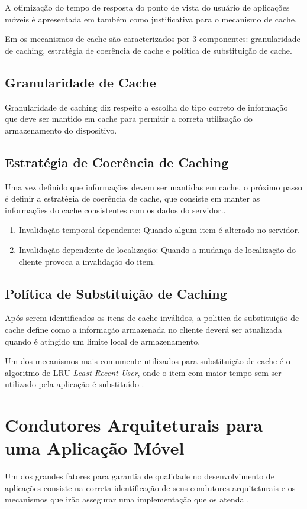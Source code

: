 \documentclass[
	article,			%
	11pt,				%
	oneside,			%
	a4paper,			%
	english,			%
	brazil,				%
	sumario=tradicional
]{abntex2}
\begin{document}
A otimização do tempo de resposta do ponto de vista do usuário de aplicações móveis é apresentada em \cite{xing2015user} também como justificativa para o mecanismo de cache.
 
 Em \cite{rathore2007overview} os mecanismos de cache são caracterizados por 3 componentes: granularidade de caching, estratégia de coerência de cache e política de substituição de cache.

\subsection{Granularidade de Cache}
Granularidade de caching diz respeito a escolha do tipo correto de informação que deve ser mantido em cache para permitir a correta utilização do armazenamento do dispositivo.

\subsection{Estratégia de Coerência de Caching}
Uma vez definido que informações devem ser mantidas em cache, o próximo passo é definir a estratégia de coerência de cache, que consiste em manter as informações do cache consistentes com os dados do servidor..

\begin{enumerate}
	\item Invalidação temporal-dependente:  Quando algum item é alterado no servidor.
	\item Invalidação dependente de localização: Quando a mudança de localização do cliente provoca a invalidação do item.
\end{enumerate}

\subsection{Política de Substituição de Caching}
Após serem identificados os itens de cache inválidos, a politica de substituição de cache define como a informação armazenada no cliente deverá ser atualizada quando é atingido um limite local de armazenamento.

Um dos mecanismos mais comumente utilizados para substituição de cache é o algoritmo de LRU \emph{Least Recent User}, onde o item com maior tempo sem ser utilizado pela aplicação é substituído \cite{xing2015user}.

\section{Condutores Arquiteturais para uma Aplicação Móvel}
Um dos grandes fatores para garantia de qualidade no desenvolvimento de aplicações consiste na correta identificação de seus condutores arquiteturais e os mecanismos que irão assegurar uma implementação que os atenda \cite{bachmann2001introduction}.
\end{document}
